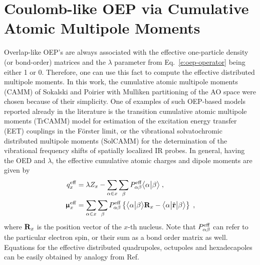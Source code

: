 \documentclass[aip,jcp,amsmath,amssymb,reprint,floatfix]{revtex4-1}
\begin{document}
\section{Coulomb-like OEP via Cumulative Atomic Multipole Moments\label{a:oep-camm}}

Overlap\hyp{}like OEP's are always associated with the effective one\hyp{}particle density
(or bond\hyp{}order) 
matrices and the $\lambda$ parameter from Eq.~\eqref{e:oep-operator} being either 1 or 0. 
Therefore, one can use this fact to compute the effective distributed multipole
moments. In this work, the cumulative atomic multipole moments (CAMM)
of Sokalski and Poirier with Mulliken partitioning of the AO space
were chosen because of their simplicity.
One of examples
of such OEP\hyp{}based models reported already in the literature is
the transition cumulative atomic multipole moments (TrCAMM) model
for estimation of the excitation energy transfer (EET) couplings in the F{\"o}rster
limit\cite{Blasiak.Maj.Cho.Gora.JCTC.2015}, 
or the vibrational solvatochromic distributed multipole moments
(SolCAMM) for the determination of the vibrational frequency shifts
of spatially localized IR probes.\cite{Blasiak.Lee.Cho.JCP.2013}
In general, having the OED and $\lambda$, the effective cumulative atomic charges
and dipole moments are given by
%
\begin{subequations} \label{e:a1-v.oep-camm}
 \begin{align} \label{e:a1-v.oep-camm.q}
  q_x^{\rm eff} &= \lambda Z_x - 
       \sum_{\alpha\in x}\sum_{\beta} 
        P_{\alpha\beta}^{\rm eff} \bigl\langle {\alpha} \bigl\lvert {\beta} \bigr\rangle \;, \\
  {\bm{\upmu}}_x^{\rm eff} &= 
       \sum_{\alpha\in x}\sum_{\beta} 
        P_{\alpha\beta}^{\rm eff}
   \left\{ 
    \bigl\langle {\alpha} \bigl\lvert {\beta} \bigr\rangle {\bf R}_x - \bigl\langle {\alpha} \bigl\lvert {\hat{\bf r}} \bigl\lvert {\beta} \bigr\rangle 
   \right\}
   \;,
 \end{align}
\end{subequations}
%
where ${\bf R}_x$ is the position vector of the $x$-th nucleus.
Note that $P_{\alpha\beta}^{\rm eff}$ can refer to the particular electron
spin, or their sum as a bond order matrix as well.
Equations for the effective distributed quadrupoles, octupoles and hexadecapoles
can be easily obtained by analogy from Ref.~\cite{Blasiak.Maj.Cho.Gora.JCTC.2015}
\end{document}
